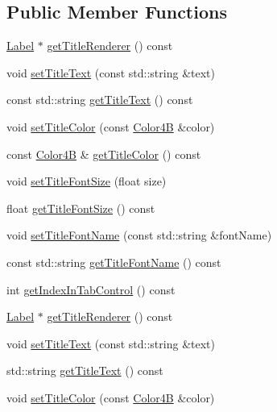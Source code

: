 \subsection*{Public Member Functions}
\begin{DoxyCompactItemize}
\item 
\hyperlink{classLabel}{Label} $\ast$ \hyperlink{classui_1_1TabHeader_a1df4f907b0f560450d391daa7b69b7f4}{get\+Title\+Renderer} () const
\item 
void \hyperlink{classui_1_1TabHeader_a48acc817abd1b8ea56653f3e3d810c9e}{set\+Title\+Text} (const std\+::string \&text)
\item 
const std\+::string \hyperlink{classui_1_1TabHeader_a512e82508a5ae505be8c4b01645212e1}{get\+Title\+Text} () const
\item 
void \hyperlink{classui_1_1TabHeader_a3692bdebfc93a2c85d5e55b568bda6b4}{set\+Title\+Color} (const \hyperlink{structColor4B}{Color4B} \&color)
\item 
const \hyperlink{structColor4B}{Color4B} \& \hyperlink{classui_1_1TabHeader_afc4c6d5f3376c342b3e5d490f2b6dffd}{get\+Title\+Color} () const
\item 
void \hyperlink{classui_1_1TabHeader_a33acd32f08867b83ae4f598c2b524e78}{set\+Title\+Font\+Size} (float size)
\item 
float \hyperlink{classui_1_1TabHeader_acc9946cbc737165413b60f73c6a28bf9}{get\+Title\+Font\+Size} () const
\item 
void \hyperlink{classui_1_1TabHeader_aae4fb72cc0d477b482c98ff34d7aaf82}{set\+Title\+Font\+Name} (const std\+::string \&font\+Name)
\item 
const std\+::string \hyperlink{classui_1_1TabHeader_a24b42bb16f6d2f8bdf66ac9aada7da4e}{get\+Title\+Font\+Name} () const
\item 
int \hyperlink{classui_1_1TabHeader_a1c469440c9a80bba3f4a38c8ff9ce5c6}{get\+Index\+In\+Tab\+Control} () const
\item 
\hyperlink{classLabel}{Label} $\ast$ \hyperlink{classui_1_1TabHeader_af967e7a49ebaf9f22bb4e14992fba2a5}{get\+Title\+Renderer} () const
\item 
void \hyperlink{classui_1_1TabHeader_a48acc817abd1b8ea56653f3e3d810c9e}{set\+Title\+Text} (const std\+::string \&text)
\item 
std\+::string \hyperlink{classui_1_1TabHeader_a512e82508a5ae505be8c4b01645212e1}{get\+Title\+Text} () const
\item 
void \hyperlink{classui_1_1TabHeader_a3692bdebfc93a2c85d5e55b568bda6b4}{set\+Title\+Color} (const \hyperlink{structColor4B}{Color4B} \&color)

\end{DoxyCompactItemize}
